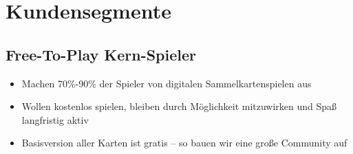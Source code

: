 \documentclass[fontsize=12]{scrartcl}
\begin{document}
	
	
	
	\section{Kundensegmente} \label{sec:Kundensegmente}
	
	\subsection{Free-To-Play Kern-Spieler} \label{subsec:Kundensegmente:Free_-_To_-_Play_Kern_-_Spieler}
	
	\begin{itemize}
		
		\item Machen 70\%-90\% der Spieler von digitalen Sammelkartenspielen aus
		
		\item Wollen kostenlos spielen, bleiben durch Möglichkeit mitzuwirken und Spaß langfristig aktiv
		
		\item Basisversion aller Karten ist gratis -- so bauen wir eine große Community auf
		
	\end{itemize}
	
\end{document}
